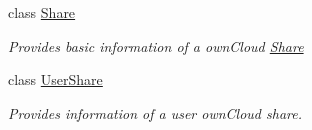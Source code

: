 \begin{DoxyCompactItemize}
class \hyperlink{classowncloudsharp_1_1_types_1_1_share}{Share}
\begin{DoxyCompactList}\small\item\em Provides basic information of a own\+Cloud \hyperlink{classowncloudsharp_1_1_types_1_1_share}{Share} \end{DoxyCompactList}\item 
class \hyperlink{classowncloudsharp_1_1_types_1_1_user_share}{User\+Share}
\begin{DoxyCompactList}\small\item\em Provides information of a user own\+Cloud share. \end{DoxyCompactList}\end{DoxyCompactItemize}
